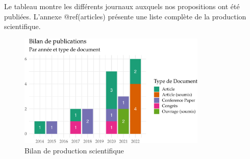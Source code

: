 \documentclass[
  11pt,
]{article}
\begin{document}
Le tableau montre les différents journaux auxquels nos propositions ont
été publiées. L'annexe @ref(articles) présente une liste complète de la
production scientifique.

\begin{figure}[H]

{\centering \includegraphics[width=0.8\textwidth,height=\textheight]{Figures/fig-bilan-1.pdf}

}

\caption{\label{fig-bilan}Bilan de production scientifique}

\end{figure}
\end{document}
